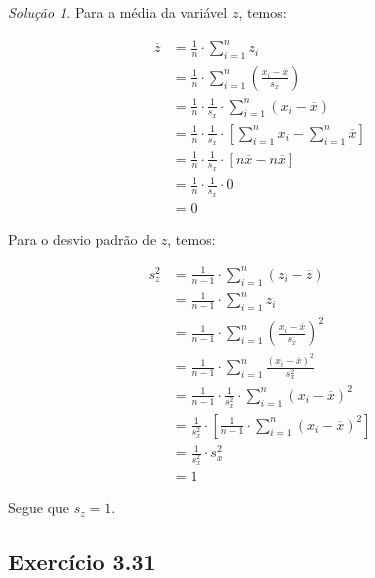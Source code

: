 \documentclass[
]{latex/krantz}
\theoremstyle{definition}
\theoremstyle{definition}
\theoremstyle{definition}
\theoremstyle{definition}
\theoremstyle{remark}
\newtheorem*{solution}{Solução}
\begin{document}
\begin{solution}
Para a média da variável \(z\), temos:

\[
\begin{split}
\overline{z} & = \frac{1}{n} \cdot \sum \limits_{i = 1}^{n} z_i \\
             & = \frac{1}{n} \cdot \sum \limits_{i = 1}^{n} \left( \frac{x_i - \overline{x}}{s_x} \right) \\
             & = \frac{1}{n} \cdot \frac{1}{s_x} \cdot \sum \limits_{i = 1}^{n} \left( x_i - \overline{x} \right) \\
             & = \frac{1}{n} \cdot \frac{1}{s_x} \cdot \left[ \sum \limits_{i = 1}^{n} x_i - \sum \limits_{i = 1}^{n} \overline{x} \right] \\
             & = \frac{1}{n} \cdot \frac{1}{s_x} \cdot \left[ n \overline{x} - n \overline{x} \right] \\
             & = \frac{1}{n} \cdot \frac{1}{s_x} \cdot 0 \\
             & = 0
\end{split}
\]

Para o desvio padrão de \(z\), temos:

\[
\begin{split}
s_z^2 & = \frac{1}{n - 1} \cdot \sum \limits_{i = 1}^{n} \left( z_i - \overline{z} \right) \\
      & = \frac{1}{n - 1} \cdot \sum \limits_{i = 1}^{n}z_i \\
      & = \frac{1}{n - 1} \cdot \sum \limits_{i = 1}^{n} \left( \frac{x_i - \overline{x}}{s_x} \right)^2 \\
      & = \frac{1}{n - 1} \cdot \sum \limits_{i = 1}^{n} \frac{\left(x_i - \overline{x}\right)^2}{s_x^2} \\
      & = \frac{1}{n - 1} \cdot \frac{1}{s_x^2} \cdot \sum \limits_{i = 1}^{n} \left(x_i - \overline{x}\right)^2 \\
      & = \frac{1}{s_x^2} \cdot \left[ \frac{1}{n - 1} \cdot  \sum \limits_{i = 1}^{n} \left(x_i - \overline{x}\right)^2 \right] \\
      & = \frac{1}{s_x^2} \cdot s_x^2 \\
      & = 1
\end{split}
\]

Segue que \(s_z = 1\).
\end{solution}

\hypertarget{exr3-31}{%
\subsection*{Exercício 3.31}\label{exr3-31}}
\end{document}

